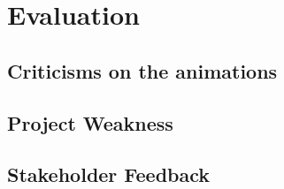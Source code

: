 \chapter{Evaluation}

\section{Criticisms on the animations}
\section{Project Weakness}
\section{Stakeholder Feedback}